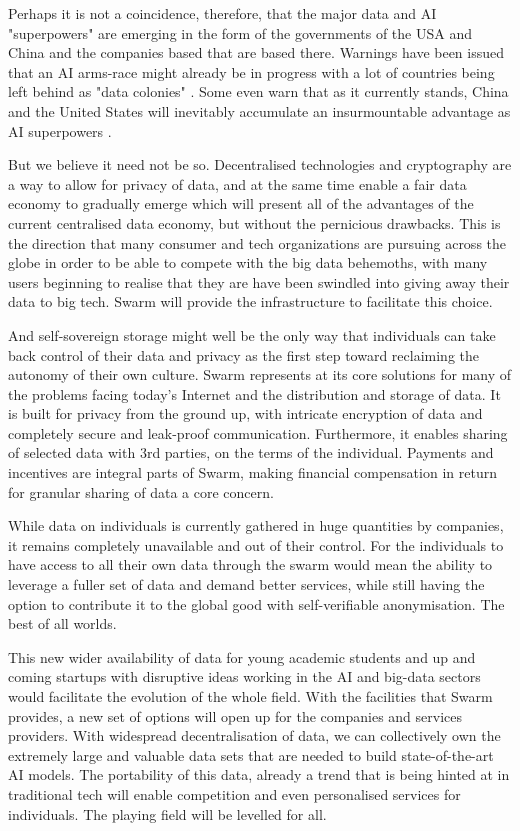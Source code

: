 Perhaps it is not a coincidence, therefore, that the major data and AI "superpowers" are emerging in the form of the governments of the USA and China and the companies based that are based there. Warnings have been issued that an AI arms-race might already be in progress with a lot of countries being left behind as "data colonies" \cite{HarariDavos2020Mar}. Some even warn that as it currently stands, China and the United States will inevitably accumulate an insurmountable advantage as AI superpowers \cite{Lee2018Sep}.

But we believe it need not be so. Decentralised technologies and cryptography are a way to allow for privacy of data, and at the same time enable a fair data economy to gradually emerge which will present all of the advantages of the current centralised data economy, but without the pernicious drawbacks. This is the direction that many consumer and tech organizations are pursuing across the globe in order to be able to compete with the big data behemoths, with many users beginning to realise that they are have been swindled into giving away their data to big tech. Swarm will provide the infrastructure to facilitate this choice.

And self-sovereign storage might well be the only way that individuals can take back control of their data and privacy as the first step toward reclaiming the autonomy of their own culture. Swarm represents at its core solutions for many of the problems facing today's Internet and the distribution and storage of data. It is built for privacy from the ground up, with intricate encryption of data and completely secure and leak-proof communication. Furthermore, it enables sharing of selected data with 3rd parties, on the terms of the individual. Payments and incentives are integral parts of Swarm, making financial compensation in return for granular sharing of data a core concern.

While data on individuals is currently gathered in huge quantities by companies, it remains completely unavailable and out of their control. For the individuals to have access to all their own data through the swarm would mean the ability to leverage a fuller set of data and demand better services, while still having the option to contribute it to the global good with self-verifiable anonymisation. The best of all worlds.

This new wider availability of data for young academic students and up and coming startups with disruptive ideas working in the AI and big-data sectors would facilitate the evolution of the whole field. With the facilities that Swarm provides, a new set of options will open up for the companies and services providers. With widespread decentralisation of data, we can collectively own the extremely large and valuable data sets that are needed to build state-of-the-art AI models. The portability of this data, already a trend that is being hinted at in traditional tech will enable competition and even personalised services for individuals. The playing field will be levelled for all. 




